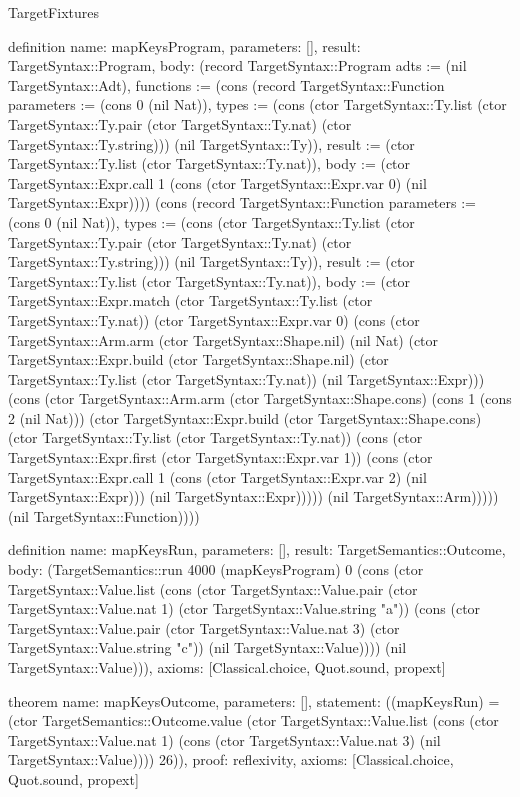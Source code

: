\begin{lexlean}{TargetFixtures}
\begin{semanticmodule}
definition{
  name: mapKeysProgram,
  parameters: [],
  result: TargetSyntax::Program,
  body: (record TargetSyntax::Program {adts := (nil TargetSyntax::Adt), functions := (cons (record TargetSyntax::Function {parameters := (cons 0 (nil Nat)), types := (cons (ctor TargetSyntax::Ty.list (ctor TargetSyntax::Ty.pair (ctor TargetSyntax::Ty.nat) (ctor TargetSyntax::Ty.string))) (nil TargetSyntax::Ty)), result := (ctor TargetSyntax::Ty.list (ctor TargetSyntax::Ty.nat)), body := (ctor TargetSyntax::Expr.call 1 (cons (ctor TargetSyntax::Expr.var 0) (nil TargetSyntax::Expr)))}) (cons (record TargetSyntax::Function {parameters := (cons 0 (nil Nat)), types := (cons (ctor TargetSyntax::Ty.list (ctor TargetSyntax::Ty.pair (ctor TargetSyntax::Ty.nat) (ctor TargetSyntax::Ty.string))) (nil TargetSyntax::Ty)), result := (ctor TargetSyntax::Ty.list (ctor TargetSyntax::Ty.nat)), body := (ctor TargetSyntax::Expr.match (ctor TargetSyntax::Ty.list (ctor TargetSyntax::Ty.nat)) (ctor TargetSyntax::Expr.var 0) (cons (ctor TargetSyntax::Arm.arm (ctor TargetSyntax::Shape.nil) (nil Nat) (ctor TargetSyntax::Expr.build (ctor TargetSyntax::Shape.nil) (ctor TargetSyntax::Ty.list (ctor TargetSyntax::Ty.nat)) (nil TargetSyntax::Expr))) (cons (ctor TargetSyntax::Arm.arm (ctor TargetSyntax::Shape.cons) (cons 1 (cons 2 (nil Nat))) (ctor TargetSyntax::Expr.build (ctor TargetSyntax::Shape.cons) (ctor TargetSyntax::Ty.list (ctor TargetSyntax::Ty.nat)) (cons (ctor TargetSyntax::Expr.first (ctor TargetSyntax::Expr.var 1)) (cons (ctor TargetSyntax::Expr.call 1 (cons (ctor TargetSyntax::Expr.var 2) (nil TargetSyntax::Expr))) (nil TargetSyntax::Expr))))) (nil TargetSyntax::Arm))))}) (nil TargetSyntax::Function)))})
}

definition{
  name: mapKeysRun,
  parameters: [],
  result: TargetSemantics::Outcome,
  body: (TargetSemantics::run 4000 (mapKeysProgram) 0 (cons (ctor TargetSyntax::Value.list (cons (ctor TargetSyntax::Value.pair (ctor TargetSyntax::Value.nat 1) (ctor TargetSyntax::Value.string "a")) (cons (ctor TargetSyntax::Value.pair (ctor TargetSyntax::Value.nat 3) (ctor TargetSyntax::Value.string "c")) (nil TargetSyntax::Value)))) (nil TargetSyntax::Value))),
  axioms: [Classical.choice, Quot.sound, propext]
}

theorem{
  name: mapKeysOutcome,
  parameters: [],
  statement: ((mapKeysRun) = (ctor TargetSemantics::Outcome.value (ctor TargetSyntax::Value.list (cons (ctor TargetSyntax::Value.nat 1) (cons (ctor TargetSyntax::Value.nat 3) (nil TargetSyntax::Value)))) 26)),
  proof: reflexivity{},
  axioms: [Classical.choice, Quot.sound, propext]
}


\end{semanticmodule}
\end{lexlean}
